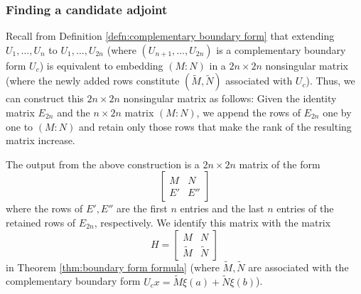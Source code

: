 \documentclass[11pt, oneside, a4paper]{article}
\begin{document}
\subsubsection{Finding a candidate adjoint}
Recall from Definition \ref{defn:complementary boundary form} that extending $U_1,\ldots,U_n$ to $U_1,\ldots,U_{2n}$ (where $(U_{n+1},\ldots, U_{2n})$ is a complementary boundary form $U_c$) is equivalent to embedding $(M:N)$ in a $2n\times 2n$ nonsingular matrix (where the newly added rows constitute $(\tilde{M}, \tilde{N})$ associated with $U_c$). Thus, we can construct this $2n\times 2n$ nonsingular matrix as follows: Given the identity matrix $E_{2n}$ and the $n\times 2n$ matrix $(M:N)$, we append the rows of $E_{2n}$ one by one to $(M:N)$ and retain only those rows that make the rank of the resulting matrix increase.


The output from the above construction is a $2n\times 2n$ matrix of the form
\[\begin{bmatrix}M & N\\ E' & E''\end{bmatrix}\]
where the rows of $E', E''$ are the first $n$ entries and the last $n$ entries of the retained rows of $E_{2n}$, respectively. We identify this matrix with the matrix
\[H = \begin{bmatrix}M&N\\ \tilde{M} & \tilde{N}\end{bmatrix}\]
in Theorem \ref{thm:boundary form formula} (where $\tilde{M}, \tilde{N}$ are associated with the complementary boundary form $U_c x = \tilde{M}\xi(a) + \tilde{N}\xi(b)$).
\end{document}
